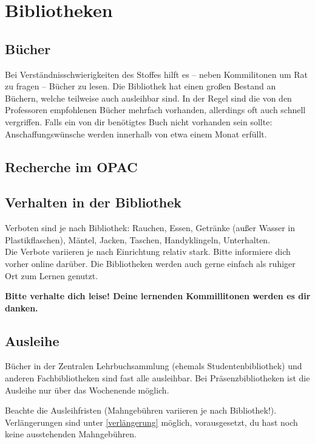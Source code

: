 ﻿\chapter{Bibliotheken}

\section{Bücher}

Bei Verständnisschwierigkeiten des Stoffes hilft es -- neben
Kommilitonen um Rat zu fragen -- Bücher zu lesen.  Die Bibliothek
hat einen großen Bestand an Büchern, welche teilweise auch ausleihbar
sind. In der Regel sind die von den Professoren empfohlenen Bücher
mehrfach vorhanden, allerdings oft auch schnell vergriffen. Falls ein
von dir benötigtes Buch nicht vorhanden sein sollte:
Anschaffungswünsche werden innerhalb von etwa einem Monat erfüllt.

\section{Recherche im OPAC}
	\begin{urlList}
	\end{urlList}

\section{Verhalten in der Bibliothek}
Verboten sind je nach Bibliothek: Rauchen, Essen, Getränke (außer Wasser in Plastikflaschen), Mäntel, Jacken, Taschen, Handyklingeln, Unterhalten.\\
Die Verbote variieren je nach Einrichtung relativ stark. Bitte informiere dich vorher online darüber.
Die Bibliotheken werden auch gerne einfach als ruhiger Ort zum Lernen genutzt.

\textbf{Bitte verhalte dich leise!
Deine lernenden Kommillitonen werden es dir danken.}

\section{Ausleihe}

Bücher in der Zentralen Lehrbuchsammlung (ehemals
Studentenbibliothek) und anderen Fachbibliotheken sind fast alle
ausleihbar. Bei Präsenzbibliotheken ist die Ausleihe nur über das
Wochenende möglich.

Beachte die Ausleihfristen (Mahngebühren variieren je nach Bibliothek!). 
Verlängerungen sind unter \ref{verlängerung}
möglich, vorausgesetzt, du hast noch keine ausstehenden Mahngebühren.

